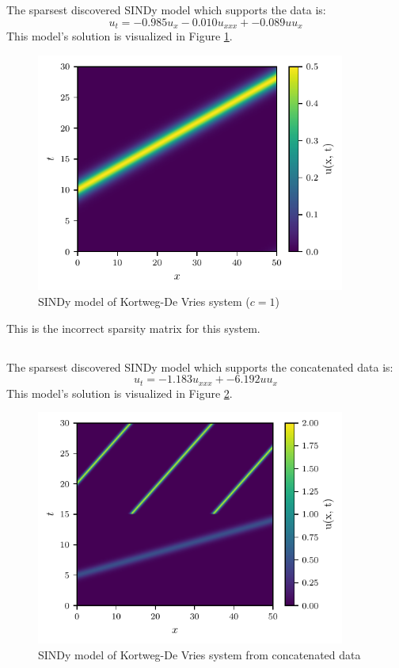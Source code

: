 \documentclass[11pt]{article}
\begin{document}
The sparsest discovered SINDy model which supports the data is:
\begin{equation}
    u_t = -0.985 u_x - 0.010 u_{xxx} + -0.089 u u_{x}
\end{equation}
This model's solution is visualized in Figure \ref{p4afig1}.
\begin{figure}[H]
    \centering
    \includegraphics[width=4in]{p4fig1.pdf}
    \caption{SINDy model of Kortweg-De Vries system ($c=1$)}
    \label{p4afig1}
\end{figure}

This is the incorrect sparsity matrix for this system.

\subsection{} %

The sparsest discovered SINDy model which supports the concatenated data is:
\begin{equation*}
    u_t = -1.183 u_{xxx} + -6.192 u u_{x}
\end{equation*}
This model's solution is visualized in Figure \ref{p4bfig1}.
\begin{figure}[H]
    \centering
    \includegraphics[width=4in]{p4fig2.pdf}
    \caption{SINDy model of Kortweg-De Vries system from concatenated data}
    \label{p4bfig1}
\end{figure}
\end{document}
